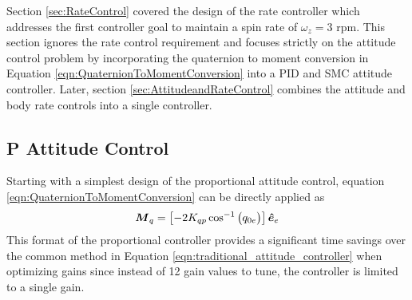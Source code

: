 Section \ref{sec:RateControl} covered the design of the rate controller which addresses the first controller goal to maintain a spin rate of $\omega_z = 3$ rpm.  This section ignores the rate control requirement and focuses strictly on the attitude control problem by incorporating the quaternion to moment conversion in Equation \ref{eqn:QuaternionToMomentConversion} into a PID and SMC attitude controller.   Later, section \ref{sec:AttitudeandRateControl} combines the attitude and body rate controls into a single controller.

\subsection{P Attitude Control}
\label{subsec:PAttitudeControl}

Starting with a simplest design of the proportional attitude control, equation \ref{eqn:QuaternionToMomentConversion} can be directly applied as
\begin{equation}
  \boldsymbol{M}_{q} = \left[-2 K_{qp} \cos^{-1} \big(q_{0e} \big) \right] \boldsymbol{\hat{e}}_e \\
  \label{eqn:PAttitudeControl}
\end{equation}
This format of the proportional controller provides a significant time savings over the common method in Equation \ref{eqn:traditional_attitude_controller} when optimizing gains since instead of 12 gain values to tune, the controller is limited to a single gain.

